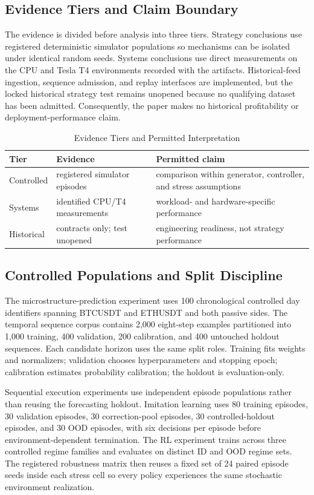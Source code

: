 \documentclass[journal,10pt]{IEEEtran}
\newcommand{\1}{\mathbf{1}}
\begin{document}
\subsection{Evidence Tiers and Claim Boundary}
The evidence is divided before analysis into three tiers. Strategy conclusions use registered deterministic simulator populations so mechanisms can be isolated under identical random seeds. Systems conclusions use direct measurements on the CPU and Tesla T4 environments recorded with the artifacts. Historical-feed ingestion, sequence admission, and replay interfaces are implemented, but the locked historical strategy test remains unopened because no qualifying dataset has been admitted. Consequently, the paper makes no historical profitability or deployment-performance claim.

\begin{table}[t]
\centering
\caption{Evidence Tiers and Permitted Interpretation}
\label{tab:evidence-tiers}
\scriptsize
\setlength{\tabcolsep}{3pt}
\begin{tabular}{p{1.4cm}p{2.0cm}p{3.45cm}}
\toprule
Tier & Evidence & Permitted claim \\
\midrule
Controlled & registered simulator episodes & comparison within generator, controller, and stress assumptions \\
Systems & identified CPU/T4 measurements & workload- and hardware-specific performance \\
Historical & contracts only; test unopened & engineering readiness, not strategy performance \\
\bottomrule
\end{tabular}
\end{table}

\subsection{Controlled Populations and Split Discipline}
The microstructure-prediction experiment uses 100 chronological controlled day identifiers spanning BTCUSDT and ETHUSDT and both passive sides. The temporal sequence corpus contains 2,000 eight-step examples partitioned into 1,000 training, 400 validation, 200 calibration, and 400 untouched holdout sequences. Each candidate horizon uses the same split roles. Training fits weights and normalizers; validation chooses hyperparameters and stopping epoch; calibration estimates probability calibration; the holdout is evaluation-only.

Sequential execution experiments use independent episode populations rather than reusing the forecasting holdout. Imitation learning uses 80 training episodes, 30 validation episodes, 30 correction-pool episodes, 30 controlled-holdout episodes, and 30 OOD episodes, with six decisions per episode before environment-dependent termination. The RL experiment trains across three controlled regime families and evaluates on distinct ID and OOD regime sets. The registered robustness matrix then reuses a fixed set of 24 paired episode seeds inside each stress cell so every policy experiences the same stochastic environment realization.
\end{document}
